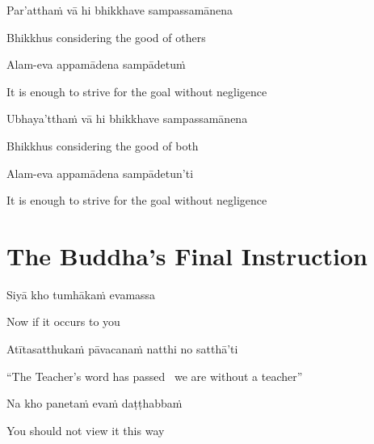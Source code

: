 Par’atthaṁ vā hi bhikkhave sampassamānena

\begin{english}
  Bhikkhus considering the good of others
\end{english}

Alam-eva appamādena sampādetuṁ

\begin{english}
  It is enough to strive for the goal without negligence
\end{english}

Ubhaya’tthaṁ vā hi bhikkhave sampassamānena

\begin{english}
  Bhikkhus considering the good of both
\end{english}

Alam-eva appamādena sampādetun'ti

\begin{english}
  It is enough to strive for the goal without negligence
\end{english}

\suttaRef{[SN 12.22]}


\section{The Buddha's Final Instruction}
\label{buddhas-final-instruction}

\begin{leader}
\end{leader}

Siyā kho tumhākaṁ evamassa

\begin{english}
  Now if it occurs to you
\end{english}

Atītasatthukaṁ pāvacanaṁ natthi no satthā’ti

\begin{english}
  “The Teacher’s word has passed \breathmark\ we are without a teacher”
\end{english}

Na kho panetaṁ evaṁ daṭṭhabbaṁ

\begin{english}
  You should not view it this way
\end{english}


